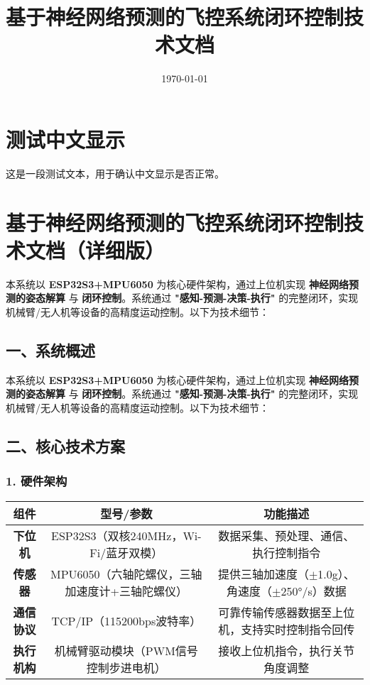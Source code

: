 \documentclass[12pt, a4paper]{article}
\title{基于神经网络预测的飞控系统闭环控制技术文档}
\author{}
\date{\today}
\begin{document}
\maketitle
\tableofcontents
\newpage

\section{测试中文显示}
这是一段测试文本，用于确认中文显示是否正常。

\section{基于神经网络预测的飞控系统闭环控制技术文档（详细版）}

本系统以 \textbf{ESP32S3+MPU6050} 为核心硬件架构，通过上位机实现 \textbf{神经网络预测的姿态解算} 与 \textbf{闭环控制}。系统通过 \textbf{"感知-预测-决策-执行"} 的完整闭环，实现机械臂/无人机等设备的高精度运动控制。以下为技术细节：

\subsection{一、系统概述}
本系统以 \textbf{ESP32S3+MPU6050} 为核心硬件架构，通过上位机实现 \textbf{神经网络预测的姿态解算} 与 \textbf{闭环控制}。系统通过 \textbf{"感知-预测-决策-执行"} 的完整闭环，实现机械臂/无人机等设备的高精度运动控制。以下为技术细节：

\subsection{二、核心技术方案}

\subsubsection{1. 硬件架构}

\begin{longtable}{|c|c|c|}
\hline
组件 & 型号/参数 & 功能描述 \\
\hline
\textbf{下位机} & ESP32S3（双核240MHz，Wi-Fi/蓝牙双模） & 数据采集、预处理、通信、执行控制指令 \\
\hline
\textbf{传感器} & MPU6050（六轴陀螺仪，三轴加速度计+三轴陀螺仪） & 提供三轴加速度（$\pm$1.0g）、角速度（$\pm$250°/s）数据 \\
\hline
\textbf{通信协议} & TCP/IP（115200bps波特率） & 可靠传输传感器数据至上位机，支持实时控制指令回传 \\
\hline
\textbf{执行机构} & 机械臂驱动模块（PWM信号控制步进电机） & 接收上位机指令，执行关节角度调整 \\
\hline
\end{longtable}
\end{document}
